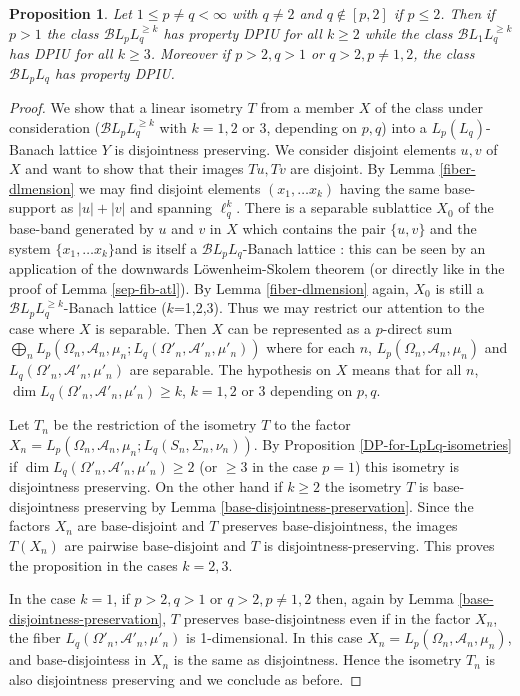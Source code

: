 \documentclass[11pt]{amsart}
\theoremstyle{plain}
\newtheorem{proposition}[theorem]{Proposition}
\theoremstyle{remark}
\newcommand{\A}{\mathcal A}
\begin{document}
\begin{proposition} Let $1\le p\ne q<\infty$ with $q\ne 2$ and $q\not\in [p,2]$ if $p\le 2$. Then if $p>1$ the  class $\mathcal BL_pL_q^{\ge k}$ has property DPIU for all $k\ge 2$ while the class $\mathcal BL_1L_q^{\ge k}$ has DPIU for all $k\ge 3$. Moreover if $p>2,q>1$ or $q>2,p\ne1,2$, the class $\mathcal BL_pL_q$  has property DPIU. 
\end{proposition}

\begin{proof} We show that a linear isometry $T$ from a member  $X$ of the class under consideration 
($\mathcal BL_pL_q^{\ge k}$  with $k=1,2$ or $3$, depending on $p,q$) into a $L_p(L_q)$-Banach lattice $Y$ is disjointness preserving. We consider disjoint elements $u,v$ of $X$ and want to show that their images $Tu,Tv$ are disjoint. By Lemma \ref{fiber-dlmension} we may find disjoint elements $(x_1,\dots x_k)$ having the same base-support as $|u|+|v|$ and spanning $\ell_q^k$. There is a  separable sublattice $X_0$ of the base-band generated by $u$ and $v$ in $X$ which contains the pair $\{u,v\}$ and the system  $\{x_1,\dots x_k\} $and is itself a  $\mathcal BL_pL_q$-Banach lattice : this can be seen by an application of the downwards L\"owenheim-Skolem theorem (or directly like in the proof of Lemma \ref{sep-fib-atl}).  By Lemma \ref{fiber-dlmension} again, $X_0$ is still a $\mathcal BL_pL_q^{\ge k}$-Banach lattice ($k$=1,2,3). Thus we may restrict our attention to the case where $X$ is separable. Then $X$ can be represented as a $p$-direct sum $\bigoplus_n L_p(\Omega_n,\A_n,\mu_n; L_q(\Omega'_n,\A'_n,\mu'_n))$ where for each $n$, $L_p(\Omega_n,\A_n,\mu_n)$ and $L_q(\Omega'_n,\A'_n,\mu'_n)$ are separable. The hypothesis on $X$ means that for all $n$, $\dim L_q(\Omega'_n,\A'_n,\mu'_n)\ge k$, $k=1,2$ or $3$ depending on $p,q$.

Let $T_n$ be the restriction of the isometry $T$ to the factor $X_n=L_p(\Omega_n,\A_n,\mu_n; L_q(S_n,\Sigma_n,\nu_n))$. By Proposition \ref{DP-for-LpLq-isometries} if $\dim L_q(\Omega'_n,\A'_n,\mu'_n)\ge 2$  (or $\ge 3$ in the case $p=1$) this isometry is disjointness preserving. On the other hand if $k\ge 2$ the isometry $T$ is base-disjointness preserving by Lemma \ref{base-disjointness-preservation}. Since the factors  $X_n$ are base-disjoint and $T$ preserves base-disjointness, the images $T(X_n)$ are pairwise base-disjoint  and $T$ is disjointness-preserving. This proves the proposition in the cases $k=2,3$.

In the case $k=1$, if $p>2,q>1$ or $q>2,p\ne1,2$ then, again by Lemma \ref{base-disjointness-preservation}, $T$ preserves base-disjointness even if in the factor $X_n$, the fiber $L_q(\Omega'_n,\A'_n,\mu'_n)$ is 1-dimensional. In this case $X_n=L_p(\Omega_n,\A_n,\mu_n)$, and base-disjointess in $X_n$ is the same as disjointness. Hence the isometry $T_n$ is also disjointness preserving and we conclude as before.
\end{proof}
\end{document}
